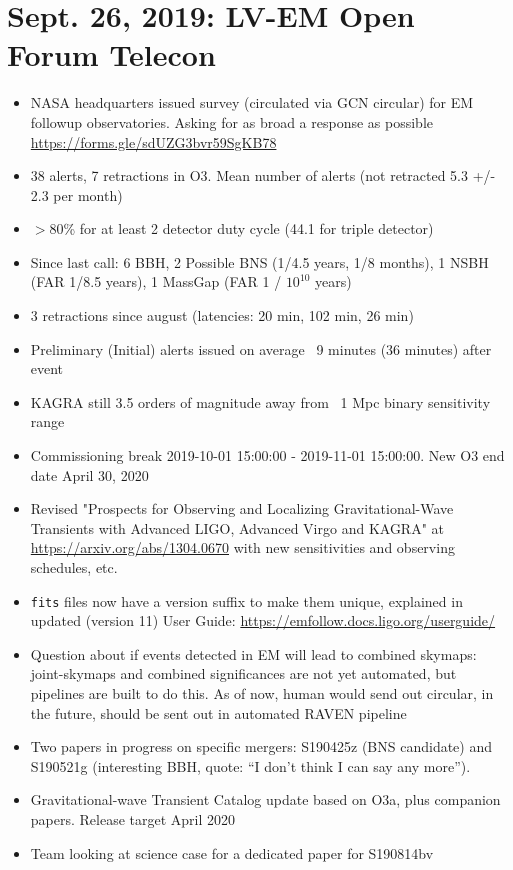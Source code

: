 \chapter{Sept. 26, 2019: LV-EM Open Forum Telecon}

\begin{itemize}
    \itemsep-1em 
    \item NASA headquarters issued survey (circulated via GCN circular) for EM followup observatories. Asking for as broad a response as possible  \url{https://forms.gle/sdUZG3bvr59SgKB78}
    \item 38 alerts, 7 retractions in O3. Mean number of alerts (not retracted 5.3 +/- 2.3 per month)
    \item $>$80\% for at least 2 detector duty cycle (44.1 for triple detector)
    \item Since last call: 6 BBH, 2 Possible BNS (1/4.5 years, 1/8 months), 1 NSBH (FAR 1/8.5 years), 1 MassGap (FAR 1 / $10^{10}$ years)
    \item 3 retractions since august (latencies: 20 min, 102 min, 26 min)
    \item Preliminary (Initial) alerts issued on average ~9 minutes (36 minutes) after event
    \item KAGRA still 3.5 orders of magnitude away from ~1 Mpc binary sensitivity range
    \item Commissioning break 2019-10-01 15:00:00 - 2019-11-01 15:00:00. New O3 end date April 30, 2020
    \item Revised "Prospects for Observing and Localizing Gravitational-Wave Transients with Advanced LIGO, Advanced Virgo and KAGRA" at \url{https://arxiv.org/abs/1304.0670} with new sensitivities and observing schedules, etc.
    \item \texttt{fits} files now have a version suffix to make them unique, explained in updated (version 11) User Guide: \url{https://emfollow.docs.ligo.org/userguide/}
    \item Question about if events detected in EM will lead to combined skymaps: joint-skymaps and combined significances are not yet automated, but pipelines are built to do this. As of now, human would send out circular, in the future, should be sent out in automated RAVEN pipeline
    \item Two papers in progress on specific mergers: S190425z (BNS candidate) and S190521g (interesting BBH, quote: ``I don't think I can say any more''). 
    \item Gravitational-wave Transient Catalog update based on O3a, plus companion papers. Release target April 2020
    \item Team looking at science case for a dedicated paper for S190814bv
\end{itemize}